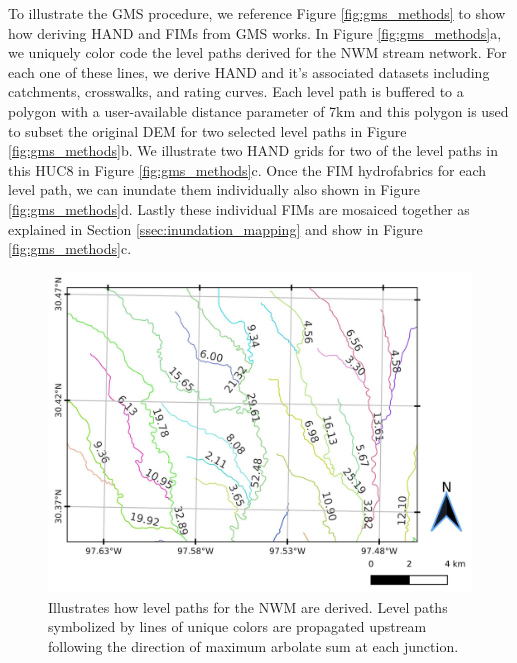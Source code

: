 To illustrate the GMS procedure, we reference Figure \ref{fig:gms_methods} to show how deriving HAND and FIMs from GMS works.
In Figure \ref{fig:gms_methods}a, we uniquely color code the level paths derived for the NWM stream network. 
For each one of these lines, we derive HAND and it's associated datasets including catchments, crosswalks, and rating curves.
Each level path is buffered to a polygon with a user-available distance parameter of 7km and this polygon is used to subset the original DEM for two selected level paths in Figure \ref{fig:gms_methods}b.
We illustrate two HAND grids for two of the level paths in this HUC8 in Figure \ref{fig:gms_methods}c.
Once the FIM hydrofabrics for each level path, we can inundate them individually also shown in Figure \ref{fig:gms_methods}d.
Lastly these individual FIMs are mosaiced together as explained in Section \ref{ssec:inundation_mapping} and show in Figure \ref{fig:gms_methods}c.
%
\begin{figure}[h!]
\centering
\includegraphics[scale=1.0]{figures/level_path_methods.jpg}
\caption{Illustrates how level paths for the NWM are derived.
Level paths symbolized by lines of unique colors are propagated upstream following the direction of maximum arbolate sum at each junction.
}
\label{fig:level_path_methods}
\end{figure}
%
%
